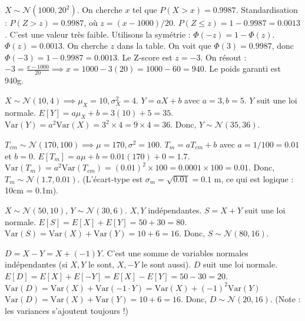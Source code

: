 \begin{correctionbox}
$X \sim \mathcal{N}(1000, 20^2)$. On cherche $x$ tel que $P(X > x) = 0.9987$.
Standardisation : $P(Z > z) = 0.9987$, où $z = (x-1000)/20$.
$P(Z \le z) = 1 - 0.9987 = 0.0013$.
C'est une valeur très faible. Utilisons la symétrie : $\Phi(-z) = 1 - \Phi(z)$.
$\Phi(z) = 0.0013$. On cherche $z$ dans la table.
On voit que $\Phi(3) = 0.9987$, donc $\Phi(-3) = 1 - 0.9987 = 0.0013$.
Le Z-score est $z = -3$.
On résout : $-3 = \frac{x - 1000}{20} \implies x = 1000 - 3(20) = 1000 - 60 = 940$.
Le poids garanti est 940g.
\end{correctionbox}

\begin{correctionbox}
$X \sim \mathcal{N}(10, 4) \implies \mu_X=10, \sigma_X^2=4$. $Y = aX + b$ avec $a=3, b=5$.
$Y$ suit une loi normale.
$E[Y] = a\mu_X + b = 3(10) + 5 = 35$.
$\text{Var}(Y) = a^2 \text{Var}(X) = 3^2 \times 4 = 9 \times 4 = 36$.
Donc, $Y \sim \mathcal{N}(35, 36)$.
\end{correctionbox}

\begin{correctionbox}
$T_{cm} \sim \mathcal{N}(170, 100) \implies \mu=170, \sigma^2=100$.
$T_m = a T_{cm} + b$ avec $a=1/100 = 0.01$ et $b=0$.
$E[T_m] = a\mu + b = 0.01(170) + 0 = 1.7$.
$\text{Var}(T_m) = a^2 \text{Var}(T_{cm}) = (0.01)^2 \times 100 = 0.0001 \times 100 = 0.01$.
Donc, $T_m \sim \mathcal{N}(1.7, 0.01)$. (L'écart-type est $\sigma_m = \sqrt{0.01} = 0.1$ m, ce qui est logique : 10cm = 0.1m).
\end{correctionbox}

\begin{correctionbox}
$X \sim \mathcal{N}(50, 10)$, $Y \sim \mathcal{N}(30, 6)$. $X, Y$ indépendantes.
$S = X + Y$ suit une loi normale.
$E[S] = E[X] + E[Y] = 50 + 30 = 80$.
$\text{Var}(S) = \text{Var}(X) + \text{Var}(Y) = 10 + 6 = 16$.
Donc, $S \sim \mathcal{N}(80, 16)$.
\end{correctionbox}

\begin{correctionbox}
$D = X - Y = X + (-1)Y$. C'est une somme de variables normales indépendantes (si $X, Y$ le sont, $X, -Y$ le sont aussi). $D$ suit une loi normale.
$E[D] = E[X] + E[-Y] = E[X] - E[Y] = 50 - 30 = 20$.
$\text{Var}(D) = \text{Var}(X) + \text{Var}(-1 \cdot Y) = \text{Var}(X) + (-1)^2 \text{Var}(Y)$
$\text{Var}(D) = \text{Var}(X) + \text{Var}(Y) = 10 + 6 = 16$.
Donc, $D \sim \mathcal{N}(20, 16)$. (Note : les variances s'ajoutent toujours !)
\end{correctionbox}

